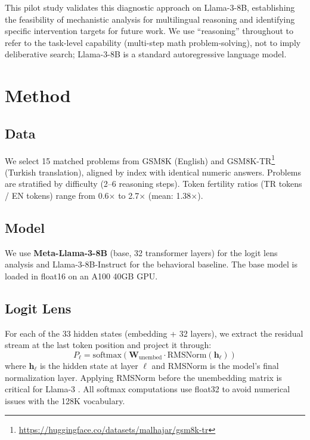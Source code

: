 \documentclass[11pt,a4paper]{article}
\begin{document}
This pilot study validates this diagnostic approach on Llama-3-8B, establishing the feasibility of mechanistic analysis for multilingual reasoning and identifying specific intervention targets for future work.
We use ``reasoning'' throughout to refer to the task-level capability (multi-step math problem-solving), not to imply deliberative search; Llama-3-8B is a standard autoregressive language model.

\section{Method}

\subsection{Data}

We select 15 matched problems from GSM8K \citep{cobbe2021gsm8k} (English) and GSM8K-TR\footnote{\url{https://huggingface.co/datasets/malhajar/gsm8k-tr}} (Turkish translation), aligned by index with identical numeric answers.
Problems are stratified by difficulty (2--6 reasoning steps).
Token fertility ratios (TR tokens / EN tokens) range from 0.6$\times$ to 2.7$\times$ (mean: 1.38$\times$).

\subsection{Model}

We use \textbf{Meta-Llama-3-8B} (base, 32 transformer layers) for the logit lens analysis and Llama-3-8B-Instruct for the behavioral baseline.
The base model is loaded in float16 on an A100 40GB GPU.

\subsection{Logit Lens}

For each of the 33 hidden states (embedding + 32 layers), we extract the residual stream at the last token position and project it through:
\begin{equation}
    P_\ell = \text{softmax}\!\left(\mathbf{W}_{\text{unembed}} \cdot \text{RMSNorm}(\mathbf{h}_\ell)\right)
\end{equation}
where $\mathbf{h}_\ell$ is the hidden state at layer $\ell$ and RMSNorm is the model's final normalization layer.
Applying RMSNorm before the unembedding matrix is critical for Llama-3 \citep{belrose2023tuned}.
All softmax computations use float32 to avoid numerical issues with the 128K vocabulary.
\end{document}
